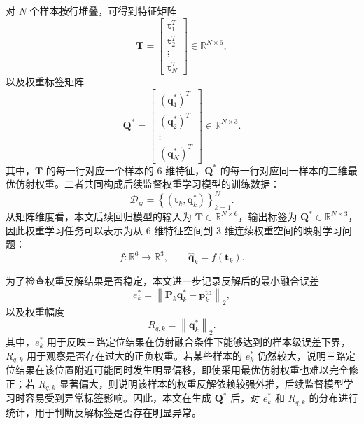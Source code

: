 对 \(N\) 个样本按行堆叠，可得到特征矩阵
\begin{equation}
\mathbf{T}
=
\begin{bmatrix}
\mathbf{t}_1^T\\
\mathbf{t}_2^T\\
\vdots\\
\mathbf{t}_N^T
\end{bmatrix}
\in\mathbb{R}^{N\times 6},
\label{eq:3_27_feature_matrix}
\end{equation}
以及权重标签矩阵
\begin{equation}
\mathbf{Q}^{\ast}
=
\begin{bmatrix}
\left(\mathbf{q}_1^\ast\right)^T\\
\left(\mathbf{q}_2^\ast\right)^T\\
\vdots\\
\left(\mathbf{q}_N^\ast\right)^T
\end{bmatrix}
\in\mathbb{R}^{N\times3}.
\label{eq:3_28_label_matrix}
\end{equation}
其中，\(\mathbf{T}\) 的每一行对应一个样本的 6 维特征，\(\mathbf{Q}^{\ast}\) 的每一行对应同一样本的三维最优仿射权重。二者共同构成后续监督权重学习模型的训练数据：
\begin{equation}
\mathcal{D}_{\mathrm{w}}
=
\left\{
\left(\mathbf{t}_k,\mathbf{q}_k^\ast\right)
\right\}_{k=1}^{N}.
\label{eq:3_29_weight_learning_dataset}
\end{equation}
从矩阵维度看，本文后续回归模型的输入为 \(\mathbf{T}\in\mathbb{R}^{N\times6}\)，输出标签为 \(\mathbf{Q}^{\ast}\in\mathbb{R}^{N\times3}\)，因此权重学习任务可以表示为从 6 维特征空间到 3 维连续权重空间的映射学习问题：
\begin{equation}
f:\mathbb{R}^{6}\rightarrow\mathbb{R}^{3},
\qquad
\hat{\mathbf{q}}_k=f(\mathbf{t}_k).
\label{eq:3_33_weight_mapping}
\end{equation}

为了检查权重反解结果是否稳定，本文进一步记录反解后的最小融合误差
\begin{equation}
e_k^\ast
=
\left\|
\mathbf{P}_k\mathbf{q}_k^\ast
-
\mathbf{p}_k^{\mathrm{th}}
\right\|_2,
\label{eq:3_30_inverse_error}
\end{equation}
以及权重幅度
\begin{equation}
R_{q,k}
=
\left\|
\mathbf{q}_k^\ast
\right\|_2.
\label{eq:3_31_inverse_weight_norm}
\end{equation}
其中，\(e_k^\ast\) 用于反映三路定位结果在仿射融合条件下能够达到的样本级误差下界，\(R_{q,k}\) 用于观察是否存在过大的正负权重。若某些样本的 \(e_k^\ast\) 仍然较大，说明三路定位结果在该位置附近可能同时发生明显偏移，即使采用最优仿射权重也难以完全修正；若 \(R_{q,k}\) 显著偏大，则说明该样本的权重反解依赖较强外推，后续监督模型学习时容易受到异常标签影响。因此，本文在生成 \(\mathbf{Q}^{\ast}\) 后，对 \(e_k^\ast\) 和 \(R_{q,k}\) 的分布进行统计，用于判断反解标签是否存在明显异常。


